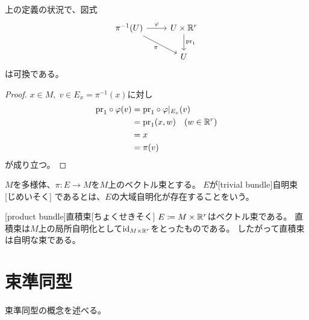 \documentclass[report]{jlreq}
\begin{document}
\begin{proposition}
    上の定義の状況で、図式
    \begin{equation}
        \begin{tikzcd}
            \pi^{-1}(U) \ar{r}{\varphi} \ar{rd}[swap]{\pi}
                & U \times \R^r \ar{d}{\mathrm{pr}_1} \\
            & U
        \end{tikzcd}
    \end{equation}
    は可換である。
\end{proposition}

\begin{proof}
    $x \in M,\; v \in E_x = \pi^{-1}(x)$に対し
    \begin{alignat}{1}
        \mathrm{pr}_1 \circ \varphi (v)
            &= \mathrm{pr}_1 \circ \varphi|_{E_x} (v) \\
            &= \mathrm{pr}_1 (x, w) \quad (w \in \mathbb{R}^r) \\
            &= x \\
            &= \pi(v)
    \end{alignat}
    が成り立つ。
\end{proof}

\begin{definition}[自明な束]
    $M$を多様体、$\pi \colon E \to M$を$M$上のベクトル束とする。
    $E$が[trivial bundle]{自明束}[じめいそく]
    であるとは、$E$の大域自明化が存在することをいう。
\end{definition}

\begin{example}
    [product bundle]{直積束}[ちょくせきそく]
    $E \coloneqq M \times \mathbb{R}^r$はベクトル束である。
    直積束は$M$上の局所自明化として$\mathrm{id}_{M \times \mathbb{R}^r}$をとったものである。
    したがって直積束は自明な束である。
\end{example}

%
\section{束準同型}

束準同型の概念を述べる。
\end{document}
